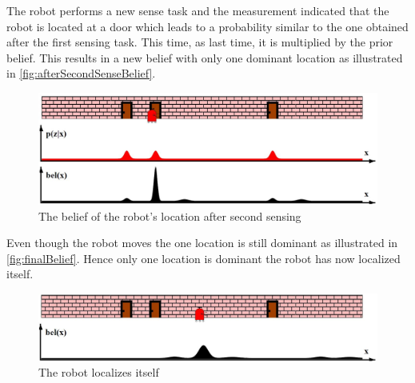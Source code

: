The robot performs a new sense task and the measurement indicated that the robot is located at a door which leads to a probability similar to the one obtained after the first sensing task. This time, as last time, it is multiplied by the prior belief. This results in a new belief with only one dominant location as illustrated in \autoref{fig:afterSecondSenseBelief}. 

\begin{figure}[H]
\centering
\includegraphics[scale=0.36]{images/MarkovLocalizationD}
\caption{The belief of the robot's location after second sensing}
\label{fig:afterSecondSenseBelief}
\end{figure}

Even though the robot moves the one location is still dominant as illustrated in \autoref{fig:finalBelief}. Hence only one location is dominant the robot has now localized itself.

\begin{figure}[H]
\centering
\includegraphics[scale=0.36]{images/MarkovLocalizationE}
\caption{The robot localizes itself}
\label{fig:finalBelief}
\end{figure}


